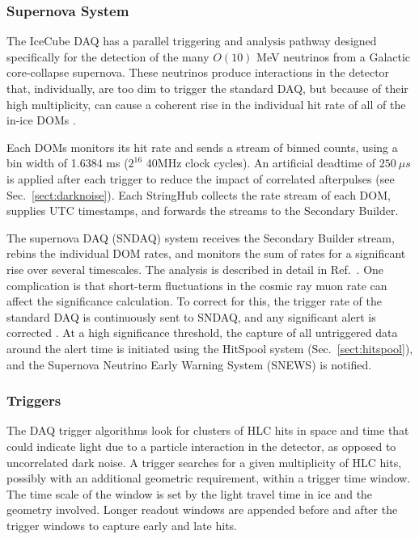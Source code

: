 \subsubsection{Supernova System}

The IceCube DAQ has a parallel triggering and analysis pathway designed
specifically for the detection of the many $O(10)$ MeV neutrinos from a Galactic
core-collapse supernova.  These neutrinos produce interactions in the
detector that, individually, are too dim to trigger the standard DAQ, but because of their
high multiplicity, can cause a coherent rise in the individual hit rate of all
of the in-ice DOMs \cite{IC3:supernova}. 

Each DOMs monitors its hit rate and sends a stream of binned
counts, using a bin width of 1.6384 ms ($2^{16}$ 40MHz clock cycles).  An
artificial deadtime of $250\ {\mu}s$ is applied after each trigger to
reduce the impact of correlated afterpulses (see
Sec.~\ref{sect:darknoise}).  Each StringHub
collects the rate stream of each DOM, supplies UTC timestamps, and
forwards the streams to the Secondary Builder.  

The supernova DAQ (SNDAQ) system receives the Secondary Builder stream,
rebins the individual DOM rates, and monitors the sum of rates for a
significant rise over several timescales.  The analysis is described in
detail in Ref.~\cite{IC3:supernova}.  One complication is that short-term
fluctuations in the cosmic ray muon rate can affect the significance
calculation.  To correct for this, the trigger rate of the standard DAQ is
continuously sent to SNDAQ, and any significant alert is corrected
\cite{IC3:icrc15_sndaq}.  At a 
high significance threshold, the capture of all untriggered data around the
alert time is initiated using the HitSpool system
(Sec.~\ref{sect:hitspool}), and the Supernova Neutrino Early Warning
System (SNEWS) \cite{SNEWS} is notified.

\subsubsection{\label{sect:online:trigger}Triggers}

The DAQ trigger algorithms look for clusters of HLC hits in space and time
that could indicate light due to a particle interaction in the detector, as opposed
to uncorrelated dark noise.  A trigger searches for a given multiplicity of
HLC hits, possibly with an additional geometric requirement, within a
trigger time window.  The time scale of the window is set by the light
travel time in ice and the geometry involved. Longer readout windows 
are appended before and after the trigger windows to capture early and late
hits.

